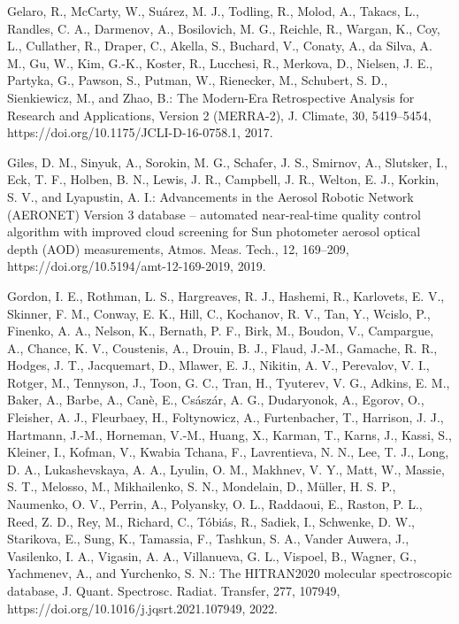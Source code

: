 \documentclass[gmd, manuscript]{copernicus}
\begin{document}
\begin{thebibliography}{}
Gelaro, R., McCarty, W., Suárez, M. J., Todling, R., Molod, A.,
Takacs, L., Randles, C. A., Darmenov, A., Bosilovich, M. G., Reichle, R.,
Wargan, K., Coy, L., Cullather, R., Draper, C., Akella, S., Buchard, V.,
Conaty, A., da Silva, A. M., Gu, W., Kim, G.-K., Koster, R., Lucchesi, R.,
Merkova, D., Nielsen, J. E., Partyka, G., Pawson, S., Putman, W.,
Rienecker, M., Schubert, S. D., Sienkiewicz, M., and Zhao, B.: The
Modern-Era Retrospective Analysis for Research and Applications, Version 2
(MERRA-2), J. Climate, 30, 5419--5454,
https://doi.org/10.1175/JCLI-D-16-0758.1, 2017.

Giles, D. M., Sinyuk, A., Sorokin, M. G., Schafer, J. S., Smirnov, A.,
Slutsker, I., Eck, T. F., Holben, B. N., Lewis, J. R., Campbell, J. R.,
Welton, E. J., Korkin, S. V., and Lyapustin, A. I.: Advancements in the
Aerosol Robotic Network (AERONET) Version 3 database -- automated
near-real-time quality control algorithm with improved cloud screening for Sun
photometer aerosol optical depth (AOD) measurements, Atmos. Meas. Tech., 12,
169--209, https://doi.org/10.5194/amt-12-169-2019, 2019.

Gordon, I. E., Rothman, L. S., Hargreaves, R. J., Hashemi, R., Karlovets,
E. V., Skinner, F. M., Conway, E. K., Hill, C., Kochanov, R. V.,
Tan, Y., Wcislo, P., Finenko, A. A., Nelson, K., Bernath, P. F.,
Birk, M., Boudon, V., Campargue, A., Chance, K. V., Coustenis, A.,
Drouin, B. J., Flaud, J.-M., Gamache, R. R., Hodges, J. T., Jacquemart, D.,
Mlawer, E. J., Nikitin, A. V., Perevalov, V. I., Rotger, M., Tennyson, J.,
Toon, G. C., Tran, H., Tyuterev, V. G., Adkins, E. M., Baker, A.,
Barbe, A., Canè, E., Császár, A. G., Dudaryonok, A., Egorov, O.,
Fleisher, A. J., Fleurbaey, H., Foltynowicz, A., Furtenbacher, T.,
Harrison, J. J., Hartmann, J.-M., Horneman, V.-M., Huang, X.,
Karman, T., Karns, J., Kassi, S., Kleiner, I., Kofman, V., Kwabia
Tchana, F., Lavrentieva, N. N., Lee, T. J., Long, D. A., Lukashevskaya,
A. A., Lyulin, O. M., Makhnev, V. Y., Matt, W., Massie, S. T.,
Melosso, M., Mikhailenko, S. N., Mondelain, D., Müller, H. S. P.,
Naumenko, O. V., Perrin, A., Polyansky, O. L., Raddaoui, E.,
Raston, P. L., Reed, Z. D., Rey, M., Richard, C., Tóbiás, R.,
Sadiek, I., Schwenke, D. W., Starikova, E., Sung, K., Tamassia, F.,
Tashkun, S. A., Vander Auwera, J., Vasilenko, I. A., Vigasin, A. A.,
Villanueva, G. L., Vispoel, B., Wagner, G., Yachmenev, A., and Yurchenko,
S. N.: The HITRAN2020 molecular spectroscopic database, J. Quant. Spectrosc.
Radiat. Transfer, 277, 107949, https://doi.org/10.1016/j.jqsrt.2021.107949,
2022.


\end{thebibliography}
\end{document}

